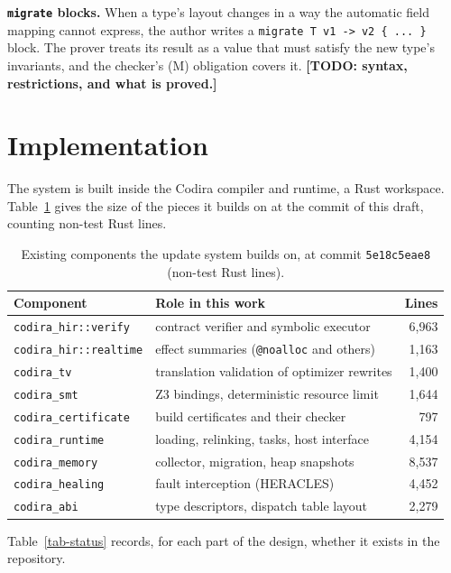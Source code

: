 \documentclass[10pt,twocolumn]{article}
\newcommand{\todo}[1]{{\color{red}\textbf{[TODO: #1]}}}
\begin{document}
\textbf{\texttt{migrate} blocks.} When a type's layout changes in a way the automatic field mapping cannot express, the author writes a \texttt{migrate T v1 -\textgreater{} v2 \{ ... \}} block. The prover treats its result as a value that must satisfy the new type's invariants, and the checker's (M) obligation covers it. \todo{syntax, restrictions, and what is proved.}

\section{Implementation}\label{sec-impl}
The system is built inside the Codira compiler and runtime, a Rust workspace. Table~\ref{tab-loc} gives the size of the pieces it builds on at the commit of this draft, counting non-test Rust lines.

\begin{table}[t]\centering\small
\begin{tabular}{llr}\toprule
Component & Role in this work & Lines \\
\midrule
\texttt{codira\_hir::verify} & contract verifier and symbolic executor & 6,963 \\
\texttt{codira\_hir::realtime} & effect summaries (\texttt{@noalloc} and others) & 1,163 \\
\texttt{codira\_tv} & translation validation of optimizer rewrites & 1,400 \\
\texttt{codira\_smt} & Z3 bindings, deterministic resource limit & 1,644 \\
\texttt{codira\_certificate} & build certificates and their checker & 797 \\
\texttt{codira\_runtime} & loading, relinking, tasks, host interface & 4,154 \\
\texttt{codira\_memory} & collector, migration, heap snapshots & 8,537 \\
\texttt{codira\_healing} & fault interception (HERACLES) & 4,452 \\
\texttt{codira\_abi} & type descriptors, dispatch table layout & 2,279 \\
\bottomrule
\end{tabular}
\caption{Existing components the update system builds on, at commit \texttt{5e18c5eae8} (non-test Rust lines).}\label{tab-loc}
\end{table}
Table~\ref{tab-status} records, for each part of the design, whether it exists in the repository.
\end{document}

